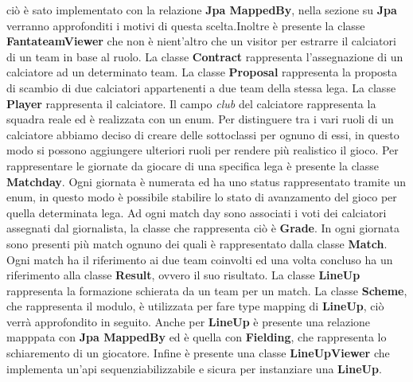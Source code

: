 ciò è sato implementato con la relazione \textbf{Jpa MappedBy}, nella sezione su \textbf{Jpa}
verranno approfonditi i motivi di questa scelta.Inoltre è presente la classe \textbf{FantateamViewer}
che non è nient'altro che un visitor per estrarre il calciatori di un team in base al ruolo. La classe \textbf{Contract} rappresenta l'assegnazione di un
calciatore ad un determinato team. La classe \textbf{Proposal} rappresenta la proposta di scambio
di due calciatori appartenenti a due team della stessa lega. La classe \textbf{Player} rappresenta il calciatore. Il
campo \textit{club} del calciatore rappresenta la squadra reale ed è realizzata con un enum.
Per distinguere tra i vari ruoli di un calciatore abbiamo deciso di creare delle sottoclassi per ognuno di essi,
in questo modo si possono aggiungere ulteriori ruoli per rendere più realistico il gioco.
Per rappresentare le giornate da giocare di una specifica lega è presente la classe \textbf{Matchday}. Ogni giornata è numerata
ed ha uno status rappresentato tramite un enum, in questo modo è possibile stabilire lo stato di avanzamento del gioco
per quella determinata lega. Ad ogni match day sono associati i voti dei calciatori
assegnati dal giornalista, la classe che rappresenta ciò è \textbf{Grade}.
In ogni giornata sono presenti più match ognuno dei quali è rappresentato 
dalla classe \textbf{Match}. Ogni match ha il riferimento ai due team coinvolti
ed una volta concluso ha un riferimento alla classe \textbf{Result}, ovvero il suo risultato.
La classe \textbf{LineUp} rappresenta la formazione schierata da un team per un match.
La classe \textbf{Scheme}, che rappresenta il modulo, è utilizzata per fare type mapping di \textbf{LineUp}, ciò
verrà approfondito in seguito. Anche per \textbf{LineUp} è presente una relazione mapppata
con \textbf{Jpa MappedBy} ed è quella con \textbf{Fielding}, che rappresenta lo schiaremento di un giocatore.
Infine è presente una classe \textbf{LineUpViewer} che implementa un'api sequenziabilizzabile e sicura
per instanziare una \textbf{LineUp}.

